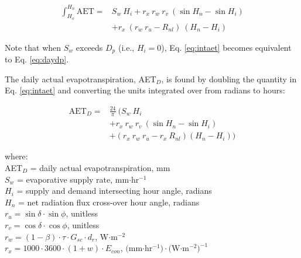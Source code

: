 \begin{equation}
\label{eq:intaet}
	\begin{split}
		\int_{H_o}^{H_n} \text{AET} = & S_w\: H_i + r_x\: r_w\: r_v \: \left(\sin H_n - \sin H_i\right) \\
		& + r_x\:\left(r_w\: r_u - R_{nl}\right)\:\left(H_n-H_i\right)
	\end{split}
\end{equation}

\noindent Note that when $S_w$ exceeds $D_p$ (i.e., $H_i = 0$), Eq. \ref{eq:intaet} becomes equivalent to Eq. \ref{eq:daydp}.

The daily actual evapotranspiration, AET$_D$, is found by doubling the quantity in Eq. \ref{eq:intaet} and converting the units integrated over from radians to hours:

\begin{equation}
\label{eq:dayaet}
	\begin{split}
		\text{AET}_D = & \frac{24}{\pi}\: ( S_w\: H_i \\
		& + r_x\: r_w\: r_v \: \left(\sin H_n - \sin H_i\right) \\
		& + \left(r_x\: r_w\: r_u - r_x\: R_{nl}\right)\left(
		    H_n-H_i\right))
	\end{split}
\end{equation}

\noindent where:\\
\indent AET$_D$ = daily actual evapotranspiration, mm\\
\indent $S_w$ = evaporative supply rate, mm$\cdot$hr$^{-1}$\\
\indent $H_i$ = supply and demand intersecting hour angle, radians\\
\indent $H_n$ = net radiation flux cross-over hour angle, radians\\
\indent $r_u = \sin\delta\cdot\sin\phi$, unitless \\
\indent $r_v = \cos\delta\cdot\cos\phi$, unitless \\
\indent $r_w = \left(1-\beta\right)\cdot\tau\cdot G_{sc}\cdot d_r$, W$\cdot$m$^{-2}$\\
\indent $r_x = 1000\cdot 3600\cdot\left(1+w\right)\cdot E_{con}$, $($mm$\cdot$hr$^{-1})\cdot ($W$\cdot$m$^{-2})^{-1}$\\

